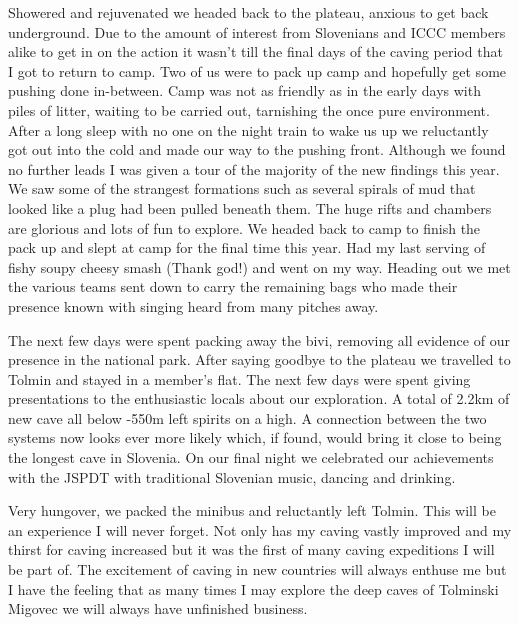Showered and rejuvenated we headed back to the plateau, anxious to get back
underground. Due to the amount of interest from Slovenians and ICCC members
alike to get in on the action it wasn't till the final days of the caving
period that I got to return to camp. Two of us were to pack up camp and
hopefully get some pushing done in-between. 
Camp was not as friendly as in the early days with piles of litter, waiting to be carried out, tarnishing the once pure environment.
After a long sleep with no one on the night train to wake us
up we reluctantly got out into the cold and made our way to the pushing front.
Although we found no further leads I was given a tour of the majority of the
new findings this year. We saw some of the strangest formations such as several
spirals of mud that looked like a plug had been pulled beneath them. The huge
rifts and chambers are glorious and lots of fun to explore. We headed back to
camp to finish the pack up and slept at camp for the final time this year. Had
my last serving of fishy soupy cheesy smash (Thank god!) and went on my way.
Heading out we met the various teams sent down to carry the remaining bags who
made their presence known with singing heard from many pitches away.

The next few days were spent packing away the bivi, removing all evidence of
our presence in the national park. After saying goodbye to the plateau we
travelled to Tolmin and stayed in a member's flat. The next few days were spent
giving presentations to the enthusiastic locals about our exploration. A total
of 2.2km of new cave all below -550m left spirits on a high. A connection
between the two systems now looks ever more likely which, if found, would bring
it close to being the longest cave in Slovenia. On our final night we
celebrated our achievements with the JSPDT with traditional Slovenian music,
dancing and drinking.

Very hungover, we packed the minibus and reluctantly left Tolmin. This will be
an experience I will never forget. Not only has my caving vastly improved and
my thirst for caving increased but it was the first of many caving expeditions
I will be part of. The excitement of caving in new countries will always
enthuse me but I have the feeling that as many times I may explore the deep
caves of Tolminski Migovec we will always have unfinished business.


